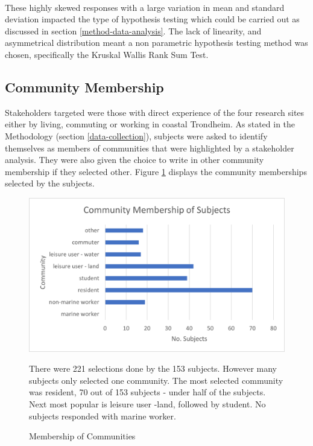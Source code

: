 \paragraph{}
These highly skewed responses with a large variation in mean and standard deviation impacted the type of hypothesis testing which could be carried out as discussed in section \ref{method-data-analysis}. The lack of linearity, and asymmetrical distribution meant a non parametric hypothesis testing method was chosen, specifically the Kruskal Wallis Rank Sum Test.

\subsection{Community Membership}
Stakeholders targeted were those with direct experience of the four research sites either by living, commuting or working in coastal Trondheim. As stated in the Methodology (section \ref{data-collection}), subjects were asked to identify themselves as members of communities that were highlighted by a stakeholder analysis. They were also given the choice to write in other community membership if they selected other. Figure \ref{fig:community_membership} displays the community memberships selected by the subjects. 

\begin{figure}[H]
    \centering
    \includegraphics{fig_results/com-mem-horizontal.png}
    \caption{Membership of Communities}{ There were 221 selections done by the 153 subjects. However many subjects only selected one community. The most selected community was resident, 70 out of 153 subjects - under half of the subjects. Next most popular is leisure user -land, followed by student. No subjects responded with marine worker. }
    \label{fig:community_membership}
\end{figure}
